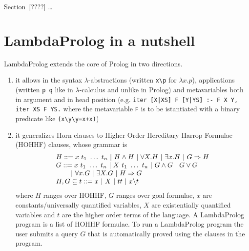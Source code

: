 \documentclass[preprint]{sigplanconf}
\begin{document}
Section~\ref{????} \ldots

\section{LambdaProlog in a nutshell}
LambdaProlog extends the core of Prolog in two directions.
\begin{enumerate}
\item it allows in the syntax $\lambda$-abstractions (written \verb+x\p+ for $\lambda x.p$), applications (written \verb+p q+ like in $\lambda$-calculus and unlike in Prolog) and metavariables both in argument and in head position (e.g. \verb+iter [X|XS] F [Y|YS] :- F X Y, iter XS F YS.+ where the metavariable \verb+F+ is to be istantiated with a binary predicate like \verb,(x\y\y=x+x),)
\item it generalizes Horn clauses to Higher Order Hereditary Harrop Formulae (HOHHF) clauses, whose grammar is
$$\begin{array}{l}
H ::= x~t_1~\ldots~t_n ~|~ H \wedge H ~|~ \forall X.H ~|~ \exists x.H ~|~ G \Rightarrow H\\
G ::= x~t_1~\ldots~t_n ~|~ X~t_1~\ldots~t_n ~|~ G \wedge G ~|~ G \vee G\\
 \hspace{0.65cm} ~|~ \forall x.G ~|~ \exists X.G ~|~ H \Rightarrow G\\
H,G \subseteq t ::= x ~|~ X ~|~ tt ~|~ x\backslash t
\end{array}$$
where $H$ ranges over HOHHF, $G$ ranges over goal formulae, $x$ are constants/universally quantified variables, $X$ are existentially quantified variables and $t$ are the higher order terms of the language. A LambdaProlog program is a list of HOHHF formulae. To run a LambdaProlog program the user submits a query $G$ that is automatically proved using the clauses in the program.
\end{enumerate}
\end{document}
